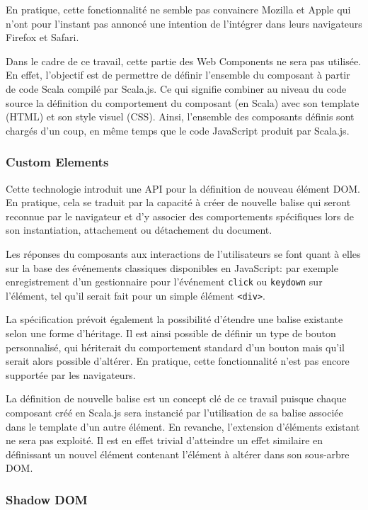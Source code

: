 En pratique, cette fonctionnalité ne semble pas convaincre Mozilla et Apple qui n'ont pour l'instant pas annoncé une intention de l'intégrer dans leurs navigateurs Firefox et Safari.

Dans le cadre de ce travail, cette partie des Web Components ne sera pas utilisée. En effet, l'objectif est de permettre de définir l'ensemble du composant à partir de code Scala compilé par Scala.js. Ce qui signifie combiner au niveau du code source la définition du comportement du composant (en Scala) avec son template (HTML) et son style visuel (CSS). Ainsi, l'ensemble des composants définis sont chargés d'un coup, en même temps que le code JavaScript produit par Scala.js.

\subsubsection{Custom Elements}

Cette technologie introduit une API pour la définition de nouveau élément DOM. En pratique, cela se traduit par la capacité à créer de nouvelle balise qui seront reconnue par le navigateur et d'y associer des comportements spécifiques lors de son instantiation, attachement ou détachement du document.

Les réponses du composants aux interactions de l'utilisateurs se font quant à elles sur la base des événements classiques disponibles en JavaScript: par exemple enregistrement d'un gestionnaire pour l'événement \texttt{click} ou \texttt{keydown} sur l'élément, tel qu'il serait fait pour un simple élément \texttt{<div>}.

La spécification prévoit également la possibilité d'étendre une balise existante selon une forme d'héritage. Il est ainsi possible de définir un type de bouton personnalisé, qui hériterait du comportement standard d'un bouton mais qu'il serait alors possible d'altérer. En pratique, cette fonctionnalité n'est pas encore supportée par les navigateurs.

La définition de nouvelle balise est un concept clé de ce travail puisque chaque composant créé en Scala.js sera instancié par l'utilisation de sa balise associée dans le template d'un autre élément. En revanche, l'extension d'éléments existant ne sera pas exploité. Il est en effet trivial d'atteindre un effet similaire en définissant un nouvel élément contenant l'élément à altérer dans son sous-arbre DOM.

\subsubsection{Shadow DOM}

